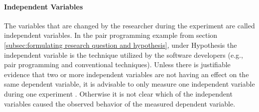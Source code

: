 
\paragraph{Independent Variables}

The variables that are changed by the researcher during the experiment are called independent variables. In the pair programming example from section \ref{subsec:formulating research question and hypothesis}, under Hypothesis the independent variable is the technique utilized by the software developers (e.g., pair programming and conventional techniques). Unless there is justifiable evidence that two or more independent variables are not having an effect on the same dependent variable, it is advisable to only measure one independent variable during one experiment \cite{BuddiesVariables}. Otherwise it is not clear which of the independent variables caused the observed behavior of the measured dependent variable. 